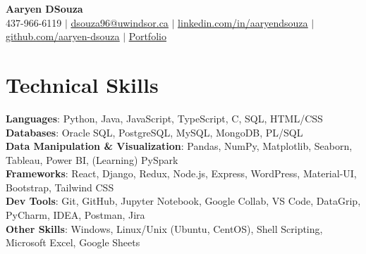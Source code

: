 \documentclass[letterpaper,11pt]{article}
\begin{document}

\begin{center}
    \textbf{\Huge Aaryen DSouza} \\ \vspace{1.5pt}
    \small 437-966-6119 $|$ \href{mailto:dsouza96@uwindsor.ca}{\underline{\phantom{/}dsouza96@uwindsor.ca\phantom{/}}} $|$ 
    \href{https://www.linkedin.com/in/aaryendsouza}{\underline{\phantom{/}linkedin.com/in/aaryendsouza\phantom{/}}} $|$
    \href{https://github.com/aaryen-dsouza}{\underline{\phantom{/}github.com/aaryen-dsouza\phantom{/}}} $|$ 
    \href{https://www.aaryen.vercel.app}{\underline{\phantom{/}Portfolio\phantom{/}}}
\end{center}

\section{Technical Skills}
 \begin{itemize}[leftmargin=0.15in, label={}]
    \small{\item{
     \textbf{Languages}{: Python, Java, JavaScript, TypeScript, C, SQL, HTML/CSS} \\
     \textbf{Databases}{: Oracle SQL, PostgreSQL, MySQL, MongoDB, PL/SQL} \\
     \textbf{Data Manipulation \& Visualization}{: Pandas, NumPy, Matplotlib, Seaborn, Tableau, Power BI, (Learning) PySpark} \\
     \textbf{Frameworks}{: React, Django, Redux, Node.js, Express, WordPress, Material-UI, Bootstrap, Tailwind CSS} \\
     \textbf{Dev Tools}{: Git, GitHub, Jupyter Notebook, Google Collab, VS Code, DataGrip, PyCharm, IDEA, Postman, Jira} \\
     \textbf{Other Skills}{: Windows, Linux/Unix (Ubuntu, CentOS), Shell Scripting, Microsoft Excel, Google Sheets}
    }}
 \end{itemize}


\end{document}
